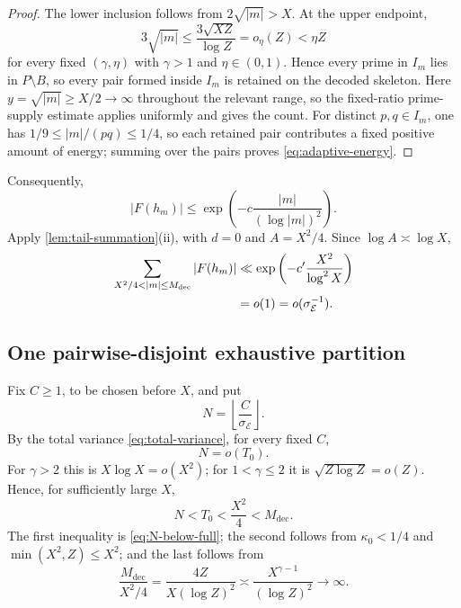 \begin{proof}
The lower inclusion follows from $2\sqrt{|m|}>X$.  At the upper endpoint,
\[
 3\sqrt{|m|}
 \leq\frac{3\sqrt{XZ}}{\log Z}
 =o_\eta(Z)<\eta Z
\]
for every fixed $(\gamma,\eta)$ with $\gamma>1$ and $\eta\in(0,1)$.  Hence every prime in $I_m$ lies in $P\setminus B$, so every pair formed inside $I_m$ is retained on the decoded skeleton.  Here $y=\sqrt{|m|}\geq X/2\to\infty$ throughout the relevant range, so the fixed-ratio prime-supply estimate applies uniformly and gives the count.  For distinct $p,q\in I_m$, one has $1/9\leq|m|/(pq)\leq1/4$, so each retained pair contributes a fixed positive amount of energy; summing over the pairs proves \cref{eq:adaptive-energy}.
\end{proof}

Consequently,
\begin{equation}
\label{eq:adaptive-pointwise}
 |F(h_m)|\leq\exp\left(-c\frac{|m|}{(\log|m|)^2}\right).
\end{equation}
Apply \cref{lem:tail-summation}(ii), with $d=0$ and $A=X^2/4$.  Since $\log A\asymp\log X$,
\begin{align}
 \sum_{X^2/4<|m|\leq M_{\mathrm{dec}}}|F(h_m)|
 &\ll\exp\left(-c'\frac{X^2}{\log^2X}\right)\notag\\
 &=o(1)=o(\sigma_{\mathcal E}^{-1}).
 \label{eq:adaptive-total}
\end{align}

\subsection{One pairwise-disjoint exhaustive partition}

Fix $C\geq1$, to be chosen before $X$, and put
\begin{equation}
\label{eq:N-major}
 N=\left\lfloor\frac{C}{\sigma_{\mathcal E}}\right\rfloor.
\end{equation}
By the total variance \cref{eq:total-variance}, for every fixed $C$,
\begin{equation}
\label{eq:N-below-full}
 N=o(T_0).
\end{equation}
For $\gamma>2$ this is $X\log X=o(X^2)$; for $1<\gamma\leq2$ it is $\sqrt{Z\log Z}=o(Z)$.  Hence, for sufficiently large $X$,
\[
 N<T_0<\frac{X^2}{4}<M_{\mathrm{dec}}.
\]
The first inequality is \cref{eq:N-below-full}; the second follows from $\kappa_0<1/4$ and $\min(X^2,Z)\leq X^2$; and the last follows from
\[
 \frac{M_{\mathrm{dec}}}{X^2/4}
 =\frac{4Z}{X(\log Z)^2}
 \asymp\frac{X^{\gamma-1}}{(\log Z)^2}
 \longrightarrow\infty.
\]

